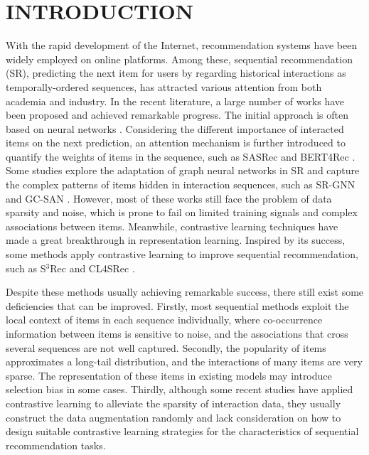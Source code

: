 \documentclass[runningheads]{llncs}
\begin{document}
\vspace{-25pt}
\section{INTRODUCTION}
\vspace{-10pt}
With the rapid development of the Internet, recommendation systems have been widely employed on online platforms. Among these, sequential recommendation (SR), predicting the next item for users by regarding historical interactions as temporally-ordered sequences, has attracted various attention from both academia and industry. In the recent literature, a large number of works have been proposed and achieved remarkable progress. 
The initial approach is often based on neural networks \cite{gru4rec,caser}.
Considering the different importance of interacted items on the next prediction, an attention mechanism is further introduced to quantify the weights of items in the sequence, such as SASRec \cite{SASRec} and BERT4Rec \cite{bert4rec}.
Some studies explore the adaptation of graph neural networks in SR and capture the complex patterns of items hidden in interaction sequences, such as SR-GNN \cite{srgnn} and GC-SAN \cite{gcsan}. 
However, most of these works still face the problem of data sparsity and noise, which is prone to fail on limited training signals and complex associations between items.   
Meanwhile, contrastive learning techniques have made a great breakthrough in representation learning. Inspired by its success, some methods apply contrastive learning to improve sequential recommendation, such as S\(^3\)Rec \cite{s3rec} and CL4SRec \cite{cl4rec}.

Despite these methods usually achieving remarkable success, there still exist some deficiencies that can be improved. Firstly, most sequential methods exploit the local context of items in each sequence individually, where co-occurrence information between items is sensitive to noise, and the associations that cross several sequences are not well captured. Secondly, the popularity of items approximates a long-tail distribution, and the interactions of many items are very sparse. The representation of these items in existing models may introduce selection bias in some cases. Thirdly, although some recent studies have applied contrastive learning to alleviate the sparsity of interaction data, they usually construct the data augmentation randomly and lack consideration on how to design suitable contrastive learning strategies for the characteristics of sequential recommendation tasks. 
\end{document}
